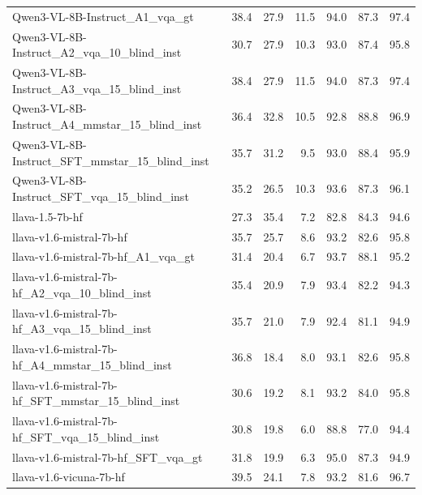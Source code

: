 \begin{tabular}{lrrrrrr}
Qwen3-VL-8B-Instruct_A1_vqa_gt & 38.4 & 27.9 & 11.5 & 94.0 & 87.3 & 97.4 \\
Qwen3-VL-8B-Instruct_A2_vqa_10_blind_inst & 30.7 & 27.9 & 10.3 & 93.0 & 87.4 & 95.8 \\
Qwen3-VL-8B-Instruct_A3_vqa_15_blind_inst & 38.4 & 27.9 & 11.5 & 94.0 & 87.3 & 97.4 \\
Qwen3-VL-8B-Instruct_A4_mmstar_15_blind_inst & 36.4 & 32.8 & 10.5 & 92.8 & 88.8 & 96.9 \\
Qwen3-VL-8B-Instruct_SFT_mmstar_15_blind_inst & 35.7 & 31.2 & 9.5 & 93.0 & 88.4 & 95.9 \\
Qwen3-VL-8B-Instruct_SFT_vqa_15_blind_inst & 35.2 & 26.5 & 10.3 & 93.6 & 87.3 & 96.1 \\
llava-1.5-7b-hf & 27.3 & 35.4 & 7.2 & 82.8 & 84.3 & 94.6 \\
llava-v1.6-mistral-7b-hf & 35.7 & 25.7 & 8.6 & 93.2 & 82.6 & 95.8 \\
llava-v1.6-mistral-7b-hf_A1_vqa_gt & 31.4 & 20.4 & 6.7 & 93.7 & 88.1 & 95.2 \\
llava-v1.6-mistral-7b-hf_A2_vqa_10_blind_inst & 35.4 & 20.9 & 7.9 & 93.4 & 82.2 & 94.3 \\
llava-v1.6-mistral-7b-hf_A3_vqa_15_blind_inst & 35.7 & 21.0 & 7.9 & 92.4 & 81.1 & 94.9 \\
llava-v1.6-mistral-7b-hf_A4_mmstar_15_blind_inst & 36.8 & 18.4 & 8.0 & 93.1 & 82.6 & 95.8 \\
llava-v1.6-mistral-7b-hf_SFT_mmstar_15_blind_inst & 30.6 & 19.2 & 8.1 & 93.2 & 84.0 & 95.8 \\
llava-v1.6-mistral-7b-hf_SFT_vqa_15_blind_inst & 30.8 & 19.8 & 6.0 & 88.8 & 77.0 & 94.4 \\
llava-v1.6-mistral-7b-hf_SFT_vqa_gt & 31.8 & 19.9 & 6.3 & 95.0 & 87.3 & 94.9 \\
llava-v1.6-vicuna-7b-hf & 39.5 & 24.1 & 7.8 & 93.2 & 81.6 & 96.7 \\
\bottomrule
\end{tabular}

